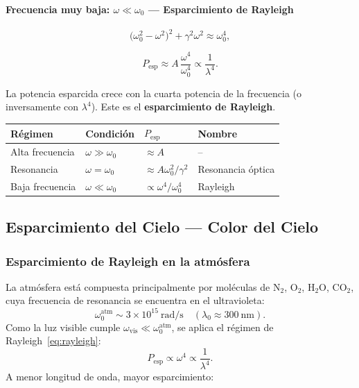\documentclass[12pt, a4paper]{article}
\theoremstyle{plain}
\theoremstyle{definition}
\theoremstyle{remark}
\begin{document}
\paragraph{Frecuencia muy baja: $\omega\ll\omega_0$ — Esparcimiento de Rayleigh}

\[
  \bigl(\omega_0^2-\omega^2\bigr)^2+\gamma^2\omega^2 \approx \omega_0^4,
\]
\begin{mdframed}[style=resultado]
\begin{equation}
  P_\text{esp} \approx A\,\frac{\omega^4}{\omega_0^4}
  \propto \frac{1}{\lambda^4}. \label{eq:rayleigh}
\end{equation}
\end{mdframed}
La potencia esparcida crece con la cuarta potencia de la frecuencia
(o inversamente con $\lambda^4$). Este es el \textbf{esparcimiento de
Rayleigh}.

\medskip
\begin{center}
\begin{tabularx}{0.98\linewidth}{@{}L{2.5cm}L{2.8cm}Y L{2.7cm}@{}}
  \toprule
  Régimen & Condición & $P_\text{esp}$ & Nombre \\
  \midrule
  Alta frecuencia & $\omega\gg\omega_0$ & $\approx A$              & -- \\
  Resonancia      & $\omega=\omega_0$   & $\approx A\omega_0^2/\gamma^2$ & Resonancia óptica \\
  Baja frecuencia & $\omega\ll\omega_0$ & $\propto\omega^4/\omega_0^4$   & Rayleigh \\
  \bottomrule
\end{tabularx}
\end{center}

\subsection{Esparcimiento del Cielo — Color del Cielo}

\subsubsection{Esparcimiento de Rayleigh en la atmósfera}

La atmósfera está compuesta principalmente por moléculas de $\mathrm{N_2}$,
$\mathrm{O_2}$, $\mathrm{H_2O}$, $\mathrm{CO_2}$, cuya frecuencia de
resonancia se encuentra en el ultravioleta:
\[
  \omega_0^\text{atm} \sim 3\times10^{15}\ \text{rad/s}
  \quad (\lambda_0\approx 300\ \text{nm}).
\]
Como la luz visible cumple $\omega_\text{vis}\ll\omega_0^\text{atm}$,
se aplica el régimen de Rayleigh~\eqref{eq:rayleigh}:
\[
  P_\text{esp} \propto \omega^4 \propto \frac{1}{\lambda^4}.
\]
A menor longitud de onda, mayor esparcimiento:
\end{document}
